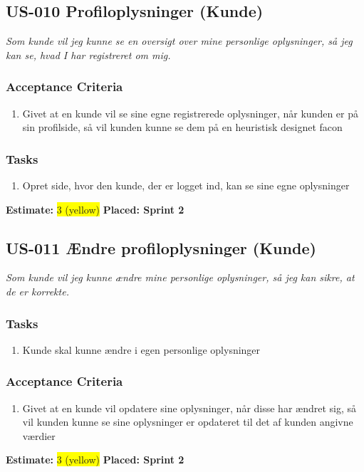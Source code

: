 \subsection{US-010 Profiloplysninger (Kunde)}
\label{sec:US-010}
\textit{Som kunde vil jeg kunne se en oversigt over mine personlige oplysninger, så jeg kan se, hvad I har registreret om mig.}
\subsubsection*{\textbf{Acceptance Criteria}}
\begin{enumerate}
  \item Givet at en kunde vil se sine egne registrerede oplysninger, når kunden er på sin profilside, så vil kunden kunne se dem på en heuristisk designet facon
\end{enumerate}
\subsubsection*{\textbf{Tasks}}
\begin{enumerate}
  \item Opret side, hvor den kunde, der er logget ind, kan se sine egne oplysninger
\end{enumerate}
\textbf{Estimate:} \colorbox{yellow}{3 (yellow)}
\textbf{Placed: Sprint 2}
\par\noindent\dotfill

\subsection{US-011 Ændre profiloplysninger (Kunde)}
\label{sec:US-011}
\textit{Som kunde vil jeg kunne ændre mine personlige oplysninger, så jeg kan sikre, at de er korrekte.}
\subsubsection*{\textbf{Tasks}}
\begin{enumerate}
  \item Kunde skal kunne ændre i egen personlige oplysninger
\end{enumerate}
\subsubsection*{\textbf{Acceptance Criteria}}
\begin{enumerate}
  \item Givet at en kunde vil opdatere sine oplysninger, når disse har ændret sig, så vil kunden kunne se sine oplysninger er opdateret til det af kunden angivne værdier
\end{enumerate}
\textbf{Estimate:} \colorbox{yellow}{3 (yellow)}
\textbf{Placed: Sprint 2}
\par\noindent\dotfill

